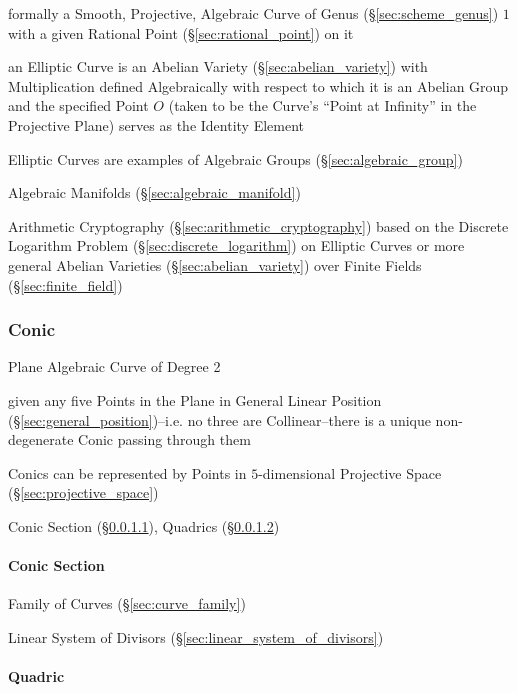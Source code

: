 \begin{itemize}
formally a Smooth, Projective, Algebraic Curve of Genus
(\S\ref{sec:scheme_genus}) $1$ with a given Rational Point
(\S\ref{sec:rational_point}) on it

an Elliptic Curve is an Abelian Variety (\S\ref{sec:abelian_variety}) with
Multiplication defined Algebraically with respect to which it is an Abelian
Group and the specified Point $O$ (taken to be the Curve's ``Point at
Infinity'' in the Projective Plane) serves as the Identity Element

Elliptic Curves are examples of Algebraic Groups (\S\ref{sec:algebraic_group})

\fist Algebraic Manifolds (\S\ref{sec:algebraic_manifold})

\fist Arithmetic Cryptography (\S\ref{sec:arithmetic_cryptography}) based on
the Discrete Logarithm Problem (\S\ref{sec:discrete_logarithm}) on Elliptic
Curves or more general Abelian Varieties (\S\ref{sec:abelian_variety}) over
Finite Fields (\S\ref{sec:finite_field})



\subsubsection{Conic}\label{sec:conic}

Plane Algebraic Curve of Degree 2

given any five Points in the Plane in General Linear Position
(\S\ref{sec:general_position})--i.e. no three are Collinear--there is a unique
non-degenerate Conic passing through them

Conics can be represented by Points in $5$-dimensional Projective Space
(\S\ref{sec:projective_space})

\fist Conic Section (\S\ref{sec:conic_section}), Quadrics (\S\ref{sec:quadric})



\paragraph{Conic Section}\label{sec:conic_section}\hfill

Family of Curves (\S\ref{sec:curve_family})

\fist Linear System of Divisors (\S\ref{sec:linear_system_of_divisors})



\paragraph{Quadric}\label{sec:quadric}\hfill


\end{itemize}
